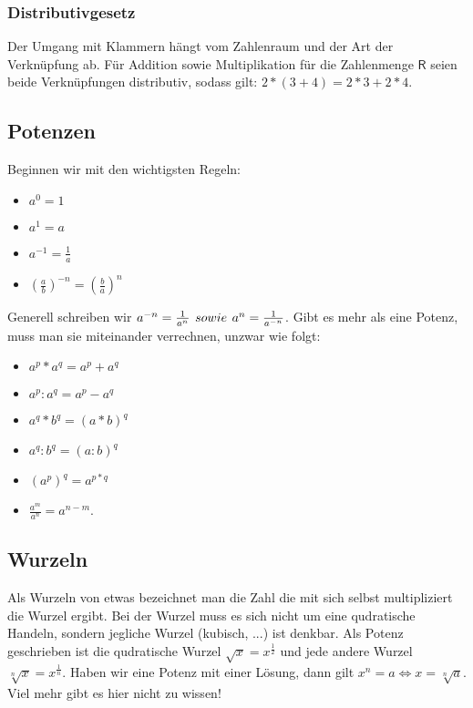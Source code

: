 \documentclass{scrreprt}
\begin{document}
\subsubsection{Distributivgesetz}\label{Distributivgesetz}
Der Umgang mit Klammern hängt vom Zahlenraum und der Art der Verknüpfung ab. Für Addition sowie Multiplikation für die Zahlenmenge $\mathsf{R}$ seien beide Verknüpfungen distributiv, sodass gilt: $2*(3+4)=2*3+2*4$. \hfill \break
\subsection{Potenzen}\label{Potenzen}
Beginnen wir mit den wichtigsten Regeln:
\begin{itemize}
    \item $a^0=1$
    \item $a^1=a$
    \item $a^{-1}=\frac{1}{a}$ 
    \item $(\frac{a}{b})^{-n}=(\frac{b}{a})^n$ 
\end{itemize}
Generell schreiben wir $a^{-n}=\frac{1}{a^n} \hspace{4px} sowie \hspace{4px} a^n=\frac{1}{a^{-n}}$. 
Gibt es mehr als eine Potenz, muss man sie miteinander verrechnen, unzwar wie folgt:
\begin{itemize}
    \item $a^p * a^q = a^p + a^q$
    \item $a^p : a^q = a^p - a^q$
    \item $a^q * b^q = (a * b)^q$
    \item $a^q : b^q = (a : b)^q$
    \item $(a^p)^q = a^{p*q}$
    \item $\frac{a^m}{a^n}=a^{n-m}$.
\end{itemize}
\subsection{Wurzeln}\label{Wurzeln}
Als Wurzeln von etwas bezeichnet man die Zahl die mit sich selbst multipliziert die Wurzel ergibt. Bei der Wurzel muss es sich nicht um eine qudratische Handeln, sondern jegliche Wurzel (kubisch, ...) ist denkbar.
Als Potenz geschrieben ist die qudratische Wurzel $\sqrt{x}=x^{\frac{1}{2}}$ und jede andere Wurzel $\sqrt[n]{x}=x^{\frac{1}{n}}$. Haben wir eine Potenz mit einer Lösung, dann gilt $x^n=a \Leftrightarrow x=\sqrt[n]{a}$.
Viel mehr gibt es hier nicht zu wissen!
\end{document}
